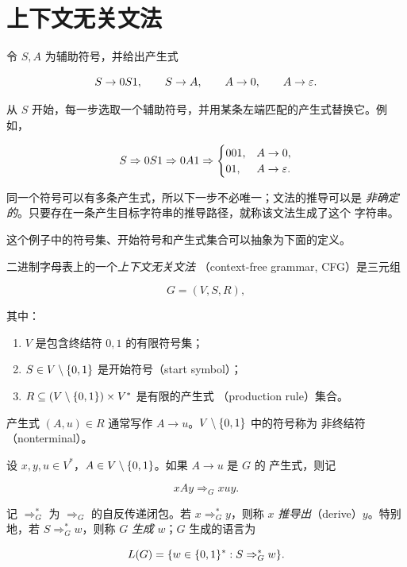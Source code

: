 \section{上下文无关文法}

\begin{example}[非确定的产生式选择]
令 $S,A$ 为辅助符号，并给出产生式

\[
  S\to 0S1,
  \qquad
  S\to A,
  \qquad
  A\to 0,
  \qquad
  A\to\varepsilon.
\]

从 $S$ 开始，每一步选取一个辅助符号，并用某条左端匹配的产生式替换它。例如，

\[
  S\Rightarrow 0S1\Rightarrow 0A1
  \Rightarrow
  \begin{cases}
    001, & A\to0,\\
    01,  & A\to\varepsilon.
  \end{cases}
\]

同一个符号可以有多条产生式，所以下一步不必唯一；文法的推导可以是
\emph{非确定的}。只要存在一条产生目标字符串的推导路径，就称该文法生成了这个
字符串。
\end{example}

这个例子中的符号集、开始符号和产生式集合可以抽象为下面的定义。

\begin{definition}[上下文无关文法]
  \label{def:cfg}
  二进制字母表上的一个\emph{上下文无关文法}
  （context-free grammar, CFG）是三元组

  \[
    G=(V,S,R),
  \]

  其中：

  \begin{enumerate}[label=\arabic*.]
    \item $V$ 是包含终结符 $0,1$ 的有限符号集；
    \item $S\in V\setminus\{0,1\}$ 是开始符号（start symbol）；
    \item $R\subseteq(V\setminus\{0,1\})\times V^*$ 是有限的产生式
      （production rule）集合。
  \end{enumerate}

  产生式 $(A,u)\in R$ 通常写作 $A\to u$。$V\setminus\{0,1\}$ 中的符号称为
  非终结符（nonterminal）。
\end{definition}

\begin{definition}[推导与生成语言]
  \label{def:cfg-derivation}
  设 $x,y,u\in V^*$，$A\in V\setminus\{0,1\}$。如果 $A\to u$ 是 $G$ 的
  产生式，则记

  \[
    xAy\Rightarrow_G xuy.
  \]

  记 $\Rightarrow_G^*$ 为 $\Rightarrow_G$ 的自反传递闭包。若
  $x\Rightarrow_G^*y$，则称 $x$ \emph{推导出}（derive）$y$。特别地，若
  $S\Rightarrow_G^*w$，则称 $G$ \emph{生成} $w$；$G$ 生成的语言为

  \[
    L(G)=\{w\in\{0,1\}^{*}:S\Rightarrow_G^*w\}.
  \]
\end{definition}

